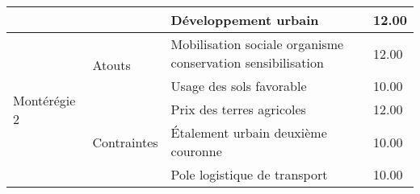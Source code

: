 \begin{table}[]
\begin{tabular}{m{}lm{}l}
                        &                              & Développement urbain                                         & 12.00          \\ \hline
\multirow{5}{*}{Montérégie 2} & \multirow{2}{*}{Atouts}      & Mobilisation sociale organisme conservation sensibilisation                    & 12.00 \\ \cline{3-4} 
                        &                              & Usage des sols favorable                                     & 10.00          \\ \cline{2-4} 
                        & \multirow{3}{*}{Contraintes} & Prix des terres agricoles                                    & 12.00          \\ \cline{3-4} 
                        &                              & Étalement urbain deuxième couronne                           & 10.00          \\ \cline{3-4} 
                        &                              & Pole logistique de transport                                 & 10.00          \\ \hline
\end{tabular}
\end{table}